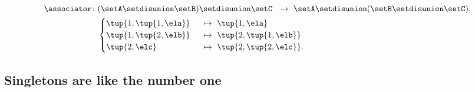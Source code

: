 \begin{solution}
    \begin{equation}\label{eq:sets-sum-associator-def}
        \begin{aligned}
            \associator \colon & (\setA \setdisunion \setB) \setdisunion \setC  \ \  \to         \ \setA \setdisunion (\setB \setdisunion \setC), \\
                               & \begin{cases}
                                     \tup{1, \tup{1, \ela}} & \ \ \mapsto   \ \tup{1, \ela}         \\
                                     \tup{1, \tup{2, \elb}} & \ \ \mapsto  \ \tup{2, \tup{1, \elb}} \\
                                     \tup{2, \elc}          & \ \ \mapsto \ \tup{2, \tup{2, \elc}}.
                                 \end{cases}
        \end{aligned}
    \end{equation}
\end{solution}


\subsection{Singletons are like the number one}


